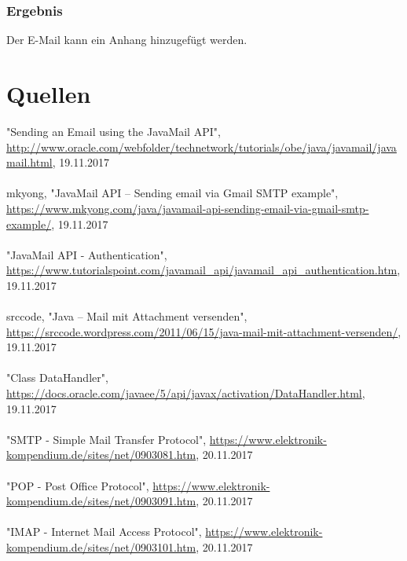 \subsubsection{Ergebnis}
Der E-Mail kann ein Anhang hinzugefügt werden.

\section{Quellen}
"Sending an Email using the JavaMail API", \href{http://www.oracle.com/webfolder/technetwork/tutorials/obe/java/javamail/javamail.html}{http://www.oracle.com/webfolder/technetwork/tutorials/obe/java/javamail/javamail.html}, 19.11.2017 \\
\\
mkyong, "JavaMail API – Sending email via Gmail SMTP example", \href{https://www.mkyong.com/java/javamail-api-sending-email-via-gmail-smtp-example/}{https://www.mkyong.com/java/javamail-api-sending-email-via-gmail-smtp-example/}, 19.11.2017 \\
\\
"JavaMail API - Authentication", \href{https://www.tutorialspoint.com/javamail\_api/javamail\_api\_authentication.htm}{https://www.tutorialspoint.com/javamail\_api/javamail\_api\_authentication.htm}, 19.11.2017 \\
\\
srccode, "Java – Mail mit Attachment versenden", \href{https://srccode.wordpress.com/2011/06/15/java-mail-mit-attachment-versenden/}{https://srccode.wordpress.com/2011/06/15/java-mail-mit-attachment-versenden/}, 19.11.2017 \\
\\
"Class DataHandler", \href{https://docs.oracle.com/javaee/5/api/javax/activation/DataHandler.html}{https://docs.oracle.com/javaee/5/api/javax/activation/DataHandler.html}, 19.11.2017 \\
\\
"SMTP - Simple Mail Transfer Protocol", \href{https://www.elektronik-kompendium.de/sites/net/0903081.htm}{https://www.elektronik-kompendium.de/sites/net/0903081.htm}, 20.11.2017 \\
\\
"POP - Post Office Protocol", \href{https://www.elektronik-kompendium.de/sites/net/0903091.htm}{https://www.elektronik-kompendium.de/sites/net/0903091.htm}, 20.11.2017 \\
\\
"IMAP - Internet Mail Access Protocol", \href{https://www.elektronik-kompendium.de/sites/net/0903101.htm}{https://www.elektronik-kompendium.de/sites/net/0903101.htm}, 20.11.2017






 
